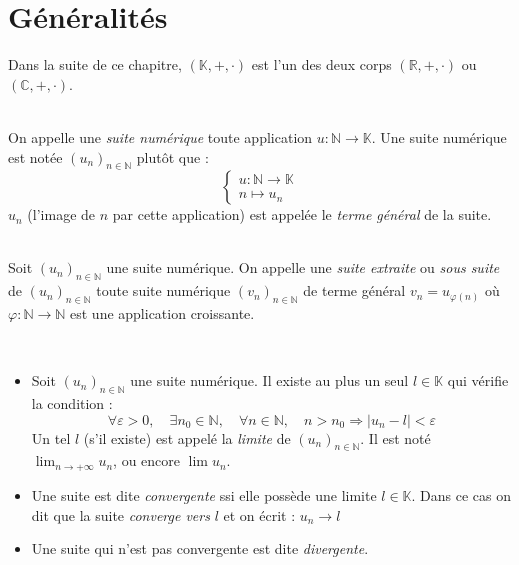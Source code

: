 \section{Généralités}
    Dans la suite de ce chapitre, \((\mathbb{K}, +, \cdot)\) est l'un des deux corps \((\mathbb{R}, +, \cdot)\) ou \((\mathbb{C}, +, \cdot)\).
    
    \begin{definition}
        \ \\
        On appelle une \emph{suite numérique} toute application \(u:\mathbb{N} \rightarrow \mathbb{K}\).
        Une suite numérique est notée \((u_n)_{n \in \mathbb{N}}\) plutôt que :
        \[
            \left\{
                \begin{array}{l}
                    u: \mathbb{N} \rightarrow \mathbb{K}\\
                    n \mapsto u_n
                \end{array}
            \right.    
        \]
        \(u_n\) (l'image de \(n\) par cette application) est appelée le \emph{terme général} de la suite.
    \end{definition}

    \begin{definition}
        \ \\
        Soit \((u_n)_{n\in\mathbb{N}}\) une suite numérique. On appelle une \emph{suite extraite} ou \emph{sous suite} de \((u_n)_{n\in\mathbb{N}}\) toute suite numérique \((v_n)_{n\in\mathbb{N}}\) de terme général \(v_n = u_{\varphi(n)}\) où \(\varphi: \mathbb{N} \rightarrow \mathbb{N}\) est une application croissante.
    \end{definition}
    
    \begin{thedef}
        \ \\
        \label{definition:limite_suite}
        \begin{itemize}
            \item Soit \((u_n)_{n\in\mathbb{N}}\) une suite numérique. Il existe au plus un seul \(l\in\mathbb{K}\) qui vérifie la condition :
            \[
                \forall \varepsilon > 0, \quad \exists n_0 \in \mathbb{N}, \quad \forall n \in \mathbb{N}, \quad n > n_0 \Rightarrow |u_n - l| < \varepsilon    
            \]
            Un tel \(l\) (s'il existe) est appelé la \emph{limite} de \((u_n)_{n\in\mathbb{N}}\). Il est noté \(\lim_{n\to+\infty}u_n\), ou encore \(\lim u_n\).
            \item Une suite est dite \emph{convergente} ssi elle possède une limite \(l \in\mathbb{K}\). Dans ce cas on dit que la suite \emph{converge vers} \(l\) et on écrit : \(u_n \to l\)
            \item Une suite qui n'est pas convergente est dite \emph{divergente}.
        \end{itemize}
    \end{thedef}

